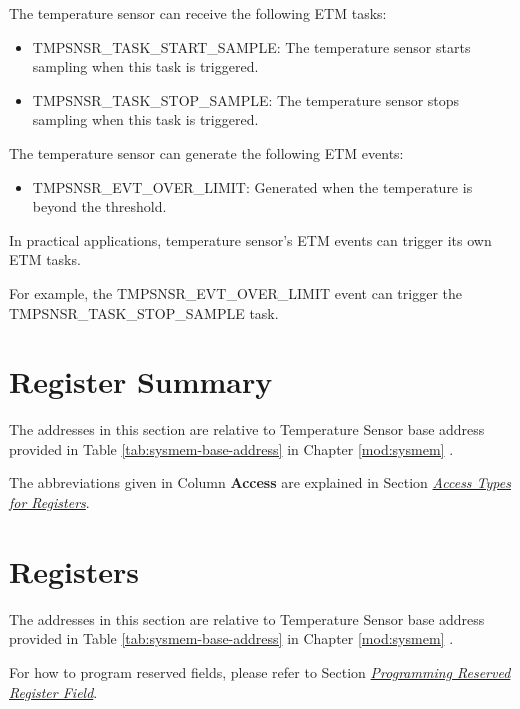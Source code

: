 \documentclass[main\_\_EN.tex]{subfiles}
\begin{document}
The temperature sensor can receive the following ETM tasks:

\begin{itemize}
    \item TMPSNSR\_TASK\_START\_SAMPLE: The temperature sensor starts sampling when this task is triggered.
    \item TMPSNSR\_TASK\_STOP\_SAMPLE: The temperature sensor stops sampling when this task is triggered.
\end{itemize}

The temperature sensor can generate the following ETM events:

\begin{itemize}
    \item TMPSNSR\_EVT\_OVER\_LIMIT: Generated when the temperature is beyond the threshold.
\end{itemize}

In practical applications, temperature sensor's ETM events can trigger its own ETM tasks.

For example, the TMPSNSR\_EVT\_OVER\_LIMIT event can trigger the TMPSNSR\_TASK\_STOP\_SAMPLE task.




\newpage
\hypertarget{tmpsen-reg-summ}{}
\section{Register Summary}
\label{sec:tmpsen-reg-summ}

The addresses in this section are relative to Temperature Sensor base address provided in Table \ref{tab:sysmem-base-address} in Chapter \ref{mod:sysmem} \textit{}.

The abbreviations given in Column \textbf{Access} are explained in Section \hyperref[glossary-access-types]{\textit{Access Types for Registers}}.







\newpage
\section{Registers}

The addresses in this section are relative to Temperature Sensor base address provided in Table \ref{tab:sysmem-base-address} in Chapter \ref{mod:sysmem} \textit{}.

For how to program reserved fields, please refer to Section \hyperref[programming-reserved-field]{\textit{Programming Reserved Register Field}}.


\end{document}
